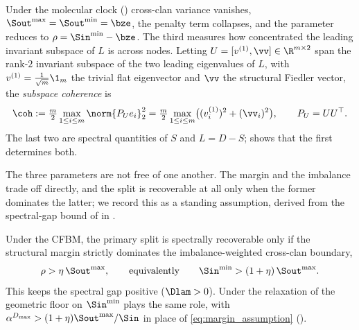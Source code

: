 Under the molecular clock () cross-clan variance vanishes,
$\Sout^{\max}=\Sout^{\min}=\bze$, the penalty term collapses, and the parameter
reduces to $\rho=\Sin^{\min}-\bze$. The third measures how concentrated the
leading invariant subspace of $L$ is across nodes. Letting
$U=[v^{(1)},\vv]\in\R^{m\times2}$ span the rank-$2$ invariant subspace of the
two leading eigenvalues of $L$, with $v^{(1)}=\tfrac1{\sqrt m}\1_m$ the trivial
flat eigenvector and $\vv$ the structural Fiedler vector, the \emph{subspace
coherence} is
\begin{equation}\label{eq:coherence_definition}
   \coh := \tfrac{m}{2}\max_{1\le i\le m}\norm{P_U e_i}_2^2
         = \tfrac{m}{2}\max_{1\le i\le m}\bigl((v_i^{(1)})^2+(\vv_i)^2\bigr),
   \qquad P_U=UU^\top.
\end{equation}
The last two are spectral quantities of $S$ and $L=D-S$; 
shows that the first determines both.

The three parameters are not free of one another. The margin and the imbalance
trade off directly, and the split is recoverable at all only when the former
dominates the latter; we record this as a standing assumption, derived from the
spectral-gap bound of  in .

\begin{assumption}\label{asm:margin}
Under the CFBM, the primary split is spectrally recoverable only if the structural
margin strictly dominates the imbalance-weighted cross-clan boundary,
\begin{equation}\label{eq:margin_assumption}
   \rho>\eta\,\Sout^{\max},\qquad\text{equivalently}\qquad
   \Sin^{\min}>(1+\eta)\,\Sout^{\max}.
\end{equation}
This keeps the spectral gap positive ($\Dlam>0$). Under the relaxation of
 the geometric floor on $\Sin^{\min}$ plays the same role, with
$\alpha^{D_{\max}}>(1+\eta)\Sout^{\max}/\Sin$ in place of
\eqref{eq:margin_assumption} ().
\end{assumption}

